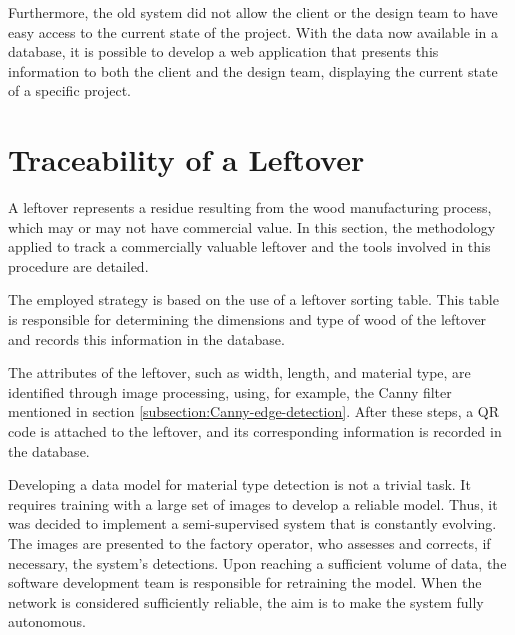 Furthermore, the old system did not allow the client or the design team to have easy access to the current state of the project. With the data now available in a database, it is possible to develop a web application that presents this information to both the client and the design team, displaying the current state of a specific project.


\section{Traceability of a Leftover}\label{section:LeftoverTraceability}


A leftover represents a residue resulting from the wood manufacturing process, which may or may not have commercial value. In this section, the methodology applied to track a commercially valuable leftover and the tools involved in this procedure are detailed.

The employed strategy is based on the use of a leftover sorting table. This table is responsible for determining the dimensions and type of wood of the leftover and records this information in the database.

The attributes of the leftover, such as width, length, and material type, are identified through image processing, using, for example, the Canny filter mentioned in section \ref{subsection:Canny-edge-detection}. After these steps, a QR code is attached to the leftover, and its corresponding information is recorded in the database.

Developing a data model for material type detection is not a trivial task. It requires training with a large set of images to develop a reliable model. Thus, it was decided to implement a semi-supervised system that is constantly evolving. The images are presented to the factory operator, who assesses and corrects, if necessary, the system's detections. Upon reaching a sufficient volume of data, the software development team is responsible for retraining the model. When the network is considered sufficiently reliable, the aim is to make the system fully autonomous.